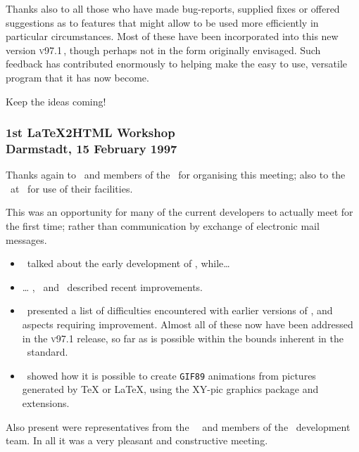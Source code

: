 \medskip\vfil\htmlrule\bigskip\noindent
Thanks also to all those who have made bug-reports, supplied fixes 
or offered suggestions as to features that might allow \latextohtml{} 
to be used more efficiently in particular circumstances. 
Most of these have been incorporated into this new version \textsc{v97.1}\,,
though perhaps not in the form originally envisaged.
Such feedback has contributed enormously to helping make \latextohtml{} the
easy to use, versatile program that it has now become.

\bigskip
\begin{center}
Keep the ideas coming!
\end{center}
\bigskip
\vfil




\subsubsection*[center]{1st \LaTeX2HTML{} Workshop\\Darmstadt, 
15 February 1997\label{darmstadt}}
Thanks again to \Lippmann\ and members of the \LiPS\ for organising this meeting; 
also to the \FIDarmstadt\ at \Darmstadt\ for use of their facilities.

\noindent
This was an opportunity for many of the current \latextohtml{} developers to
actually meet for the first time; rather than communication by exchange
of electronic mail messages.
%
\begin{itemize}
\item
\NikosDrakos\ talked about the early development of \latextohtml, while\dots
\item \dots
\RossMoore, \Lippmann\ and \Rouchal\ described recent improvements. 
\item
\Goossens\ presented a list of difficulties encountered with earlier
versions of \latextohtml{}, and aspects requiring improvement.
Almost all of these now have been addressed in the \textsc{v97.1} release,
so far as is possible within the bounds inherent in the \HTMLiii\ standard.
\item
\KrisRose\ showed how it is possible to create \texttt{GIF89} animations 
from pictures generated by \TeX{} or \LaTeX{}, using the XY-pic graphics 
package and extensions.
\end{itemize}

\noindent
Also present were representatives from the \DANTE\ \Praesidium\ and 
members of the \LaTeXiii\ development team.\html{\\} 
In all it was a very pleasant and constructive meeting.


